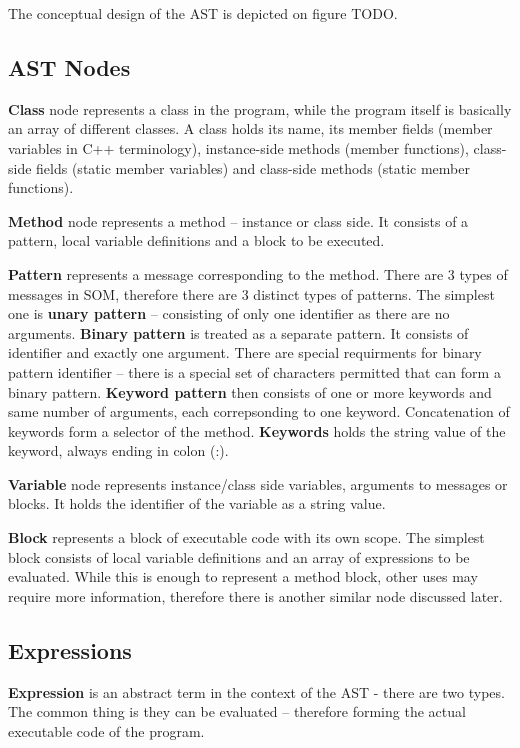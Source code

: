 \documentclass[thesis=M,english]{FITthesis}[2019/12/23]
\begin{document}
The conceptual design of the AST is depicted on figure TODO.

\subsection{AST Nodes}
\textbf{Class} node represents a class in the program, while the program itself is basically an array of different classes. A class
holds its name, its member fields (member variables in C++ terminology), instance-side methods (member functions), class-side fields
(static member variables) and class-side methods (static member functions).

\textbf{Method} node represents a method -- instance or class side. It consists of a pattern, local variable definitions and a block
to be executed.

\textbf{Pattern} represents a message corresponding to the method. There are 3 types of messages in SOM, therefore there are 3 distinct
types of patterns. The simplest one is \textbf{unary pattern} -- consisting of only one identifier as there are no arguments. \textbf{Binary pattern}
is treated as a separate pattern. It consists of identifier and exactly one argument. There are special requirments for binary pattern identifier
-- there is a special set of characters permitted that can form a binary pattern. \textbf{Keyword pattern} then consists of one or more keywords and
same number of arguments, each correpsonding to one keyword. Concatenation of keywords form a selector of the method. \textbf{Keywords} holds the string
value of the keyword, always ending in colon (:).

\textbf{Variable} node represents instance/class side variables, arguments to messages or blocks. It holds the identifier of the variable as a string value.

\textbf{Block} represents a block of executable code with its own scope. The simplest block consists of local variable definitions and an array of
expressions to be evaluated. While this is enough to represent a method block, other uses may require more information, therefore there is another
similar node discussed later.

\subsection{Expressions}
\textbf{Expression} is an abstract term in the context of the AST - there are two types. The common thing is they can be evaluated -- therefore forming
the actual executable code of the program. 
\end{document}
